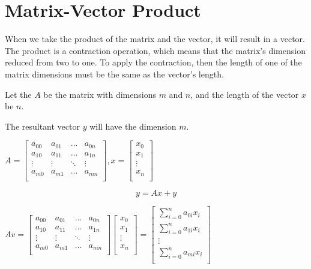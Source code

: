 \chapter{Matrix-Vector Product}

When we take the product of the matrix and the vector, 
it will result in a vector. The product is a contraction 
operation, which means that the matrix's dimension reduced from two to one.
To apply the contraction, then the length of one of the matrix dimensions 
must be the same as the vector's length.

Let the $A$ be the matrix with dimensions $m$ and $n$, 
and the length of the vector $x$ be $n$.

The resultant vector $y$ will have the dimension $m$.

\vspace*{0.5 cm}
$
A = 
\begin{bmatrix}
    a_{00}  & a_{01}    & \dots     & a_{0n}\\
    a_{10}  & a_{11}    & \dots     & a_{1n}\\
    \vdots  & \vdots    & \ddots    & \vdots\\
    a_{m0}  & a_{m1}    & \dots     & a_{mn}\\
\end{bmatrix}
, x =
\begin{bmatrix}
    x_0\\
    x_1\\
    \vdots\\
    x_n\\
\end{bmatrix}
$

\begin{equation}
    y = Ax + y
    \label{eq:mtv}
\end{equation}

$
Av = 
\begin{bmatrix}
    a_{00}  & a_{01}    & \dots     & a_{0n}\\
    a_{10}  & a_{11}    & \dots     & a_{1n}\\
    \vdots  & \vdots    & \ddots    & \vdots\\
    a_{m0}  & a_{m1}    & \dots     & a_{mn}\\
\end{bmatrix}
\begin{bmatrix}
    x_0\\
    x_1\\
    \vdots\\
    x_n\\
\end{bmatrix}
=
\begin{bmatrix}
    \sum_{i=0}^na_{0i}x_i\\
    \sum_{i=0}^na_{1i}x_i\\
    \vdots\\
    \sum_{i=0}^na_{mi}x_i\\
\end{bmatrix}
$

